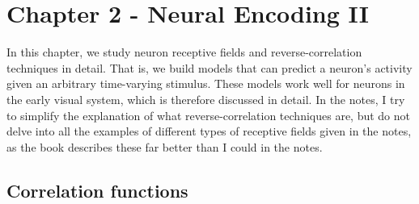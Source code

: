\documentclass{article}
\begin{document}
\begin{figure}[H]
	\centering

\end{figure}

\section{Chapter 2 - Neural Encoding II}

In this chapter, we study neuron receptive fields and reverse-correlation techniques in detail. That is, we build models that can predict a neuron's activity given an arbitrary time-varying stimulus. These models work well for neurons in the early visual system, which is therefore discussed in detail. In the notes, I try to simplify the explanation of what reverse-correlation techniques are, but do not delve into all the examples of different types of receptive fields given in the notes, as the book describes these far better than I could in the notes.

\subsection{Correlation functions}
\end{document}
